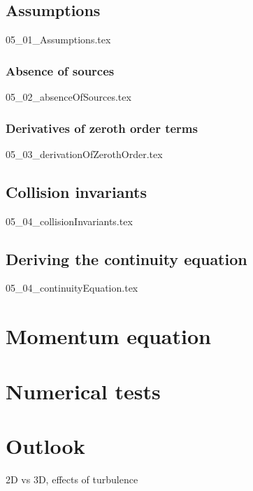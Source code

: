 \documentclass[12pt,a4paper,twoside]{article}
\begin{document}
\subsection{Assumptions}
\label{sub: Assumptions}
{05_01_Assumptions.tex}

\subsubsection{Absence of sources}
\label{subs: Absence of sources}
{05_02_absenceOfSources.tex}

\subsubsection{Derivatives of zeroth order terms}
\label{subs: Derivatives of zeroth order terms}
{05_03_derivationOfZerothOrder.tex}

\subsection{Collision invariants}
\label{sub: Collision invariants}
{05_04_collisionInvariants.tex}

\subsection{Deriving the continuity equation}
\label{sub: Deriving the continuity equation}
{05_04_continuityEquation.tex}

\section{Momentum equation}
\label{sec: Momentum equation}

\section{Numerical tests}
\label{sec: Numerics}

\section{Outlook}
\label{sec: Outlook}
2D vs 3D, effects of turbulence
\end{document}
